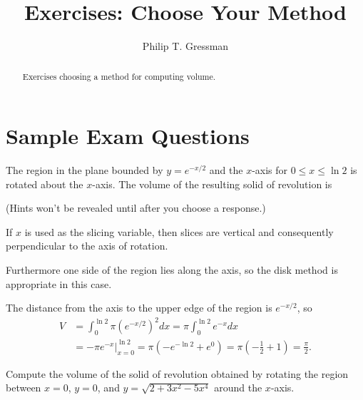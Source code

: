 \documentclass{ximera}
\title{Exercises: Choose Your Method}
\author{Philip T. Gressman}
\begin{document}
\begin{abstract}
Exercises choosing a method for computing volume.
\end{abstract}
\maketitle

\section*{Sample Exam Questions}

\begin{question}%
The region in the plane bounded by $y = e^{-x/2}$ and the $x$-axis for $0 \leq x \leq \ln 2$ is rotated about the $x$-axis. The volume of the resulting solid of revolution is
\begin{multiplechoice}
\choice{\(\displaystyle 2 \pi\)}
\end{multiplechoice}
(Hints won't be revealed until after you choose a response.)
\begin{feedback}
If $x$ is used as the slicing variable, then slices are vertical and consequently perpendicular to the axis of rotation. \begin{hint}
Furthermore one side of the region lies along the axis, so the disk method is appropriate in this case. 
\begin{hint}
The distance from the axis to the upper edge of the region is $e^{-x/2}$, so
\[ \begin{aligned} V & = \int_0^{\ln 2} \pi \left( e^{-x/2} \right)^2 dx = \pi \int_0^{\ln 2} e^{-x} dx \\ & =  \left. - \pi e^{-x} \right|_{x=0}^{\ln 2} = \pi (-e^{-\ln 2} + e^0) = \pi \left( - \frac{1}{2} + 1 \right) = \frac{\pi}{2}. \end{aligned}\]
\end{hint}
\end{hint}
\end{feedback}

\end{question}

\begin{question}%
Compute the volume of the solid of revolution obtained by rotating the region between $x=0$, $y=0$, and $y=\sqrt{2+3x^2 - 5x^4}$ around the $x$-axis.
\begin{multiplechoice} 
\choice{\(\displaystyle - \pi\)}
\choice{\(\displaystyle \pi\)}
\choice[correct]{\(\displaystyle 2 \pi\)}
\choice{\(\displaystyle 3 \pi\)}
\choice{\(\displaystyle 4 \pi\)}
\end{multiplechoice}

\end{question}
\end{document}
